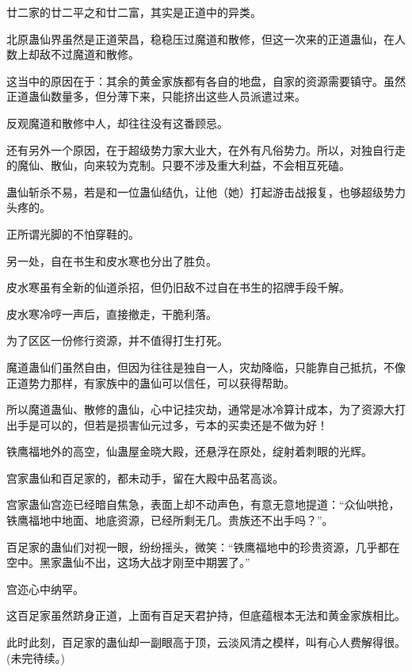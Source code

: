 \begin{this_body}
廿二家的廿二平之和廿二富，其实是正道中的异类。

北原蛊仙界虽然是正道荣昌，稳稳压过魔道和散修，但这一次来的正道蛊仙，在人数上却敌不过魔道和散修。

这当中的原因在于：其余的黄金家族都有各自的地盘，自家的资源需要镇守。虽然正道蛊仙数量多，但分薄下来，只能挤出这些人员派遣过来。

反观魔道和散修中人，却往往没有这番顾忌。

还有另外一个原因，在于超级势力家大业大，在外有凡俗势力。所以，对独自行走的魔仙、散仙，向来较为克制。只要不涉及重大利益，不会相互死磕。

蛊仙斩杀不易，若是和一位蛊仙结仇，让他（她）打起游击战报复，也够超级势力头疼的。

正所谓光脚的不怕穿鞋的。

另一处，自在书生和皮水寒也分出了胜负。

皮水寒虽有全新的仙道杀招，但仍旧敌不过自在书生的招牌手段千解。

皮水寒冷哼一声后，直接撤走，干脆利落。

为了区区一份修行资源，并不值得打生打死。

魔道蛊仙们虽然自由，但因为往往是独自一人，灾劫降临，只能靠自己抵抗，不像正道势力那样，有家族中的蛊仙可以信任，可以获得帮助。

所以魔道蛊仙、散修的蛊仙，心中记挂灾劫，通常是冰冷算计成本，为了资源大打出手是可以的，但若是损害仙元过多，亏本的买卖还是不做为好！

铁鹰福地外的高空，仙蛊屋金晓大殿，还悬浮在原处，绽射着刺眼的光辉。

宫家蛊仙和百足家的，都未动手，留在大殿中品茗高谈。

宫家蛊仙宫迩已经暗自焦急，表面上却不动声色，有意无意地提道：“众仙哄抢，铁鹰福地中地面、地底资源，已经所剩无几。贵族还不出手吗？”。

百足家的蛊仙们对视一眼，纷纷摇头，微笑：“铁鹰福地中的珍贵资源，几乎都在空中。黑家蛊仙不出，这场大战才刚至中期罢了。”

宫迩心中纳罕。

这百足家虽然跻身正道，上面有百足天君护持，但底蕴根本无法和黄金家族相比。

此时此刻，百足家的蛊仙却一副眼高于顶，云淡风清之模样，叫有心人费解得很。(未完待续。)

\end{this_body}

